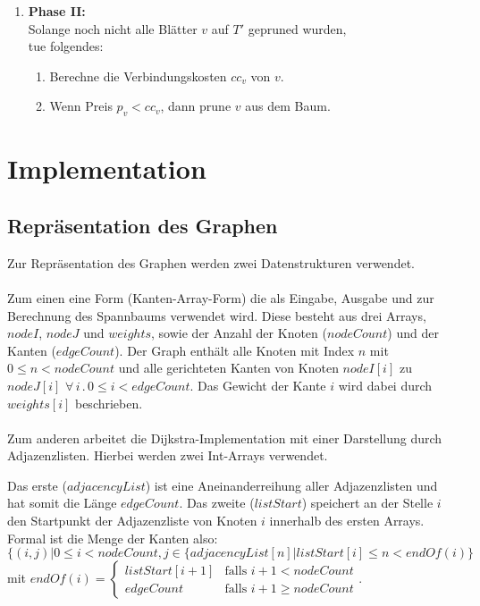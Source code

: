 \documentclass[a4paper,10pt]{article}
\begin{document}
\begin{algorithm}
\begin{enumerate}
\item\textbf{Phase II:}\\
Solange noch nicht alle Blätter $v$ auf $T'$ gepruned wurden,\\ tue folgendes:
\begin{enumerate}
\item Berechne die Verbindungskosten $cc_v$ von $v$.
\item Wenn Preis $p_v < cc_v$, dann prune $v$ aus dem Baum.
\end{enumerate} 
\end{enumerate}      
\end{algorithm}

\section{Implementation}
\subsection{Repräsentation des Graphen}
Zur Repräsentation des Graphen werden zwei Datenstrukturen verwendet.\\
\\
Zum einen eine Form (Kanten-Array-Form) die als Eingabe, Ausgabe und zur Berechnung des Spannbaums verwendet wird. Diese besteht aus drei Arrays, $nodeI$, $nodeJ$ und $weights$, sowie der Anzahl der Knoten ($nodeCount$) und der Kanten ($edgeCount$). Der Graph enthält alle Knoten mit Index $n$ mit $ 0 \le n < nodeCount$ und alle gerichteten Kanten von Knoten $nodeI[i]$ zu $nodeJ[i]$ $\forall \,i\,.\,0 \le i < edgeCount$. Das Gewicht der Kante $i$ wird dabei durch $weights[i]$ beschrieben.\\
\\
Zum anderen arbeitet die Dijkstra-Implementation mit einer Darstellung durch Adjazenzlisten. Hierbei werden zwei Int-Arrays verwendet.

Das erste ($adjacencyList$) ist eine Aneinanderreihung aller Adjazenzlisten und hat somit die Länge $edgeCount$. Das zweite ($listStart$) speichert an der Stelle $i$ den Startpunkt der Adjazenzliste von Knoten $i$ innerhalb des ersten Arrays. Formal ist die Menge der Kanten also:\\
$\{ (i,j) | 0 \le i < nodeCount, 
j \in \{adjacencyList[n]|listStart[i] \le n < endOf(i)\}$\\ mit $endOf(i) = 
\left\{
	\begin{array}{ll}
		listStart[i+1]  & \mbox{falls } i+1 < nodeCount \\
		edgeCount & \mbox{falls } i+1 \ge nodeCount
	\end{array}
\right.$.
\bigskip
\end{document}
